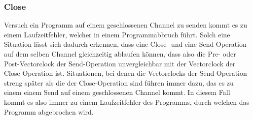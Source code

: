 \subsubsection{Close}
Versuch ein Programm auf einem geschlossenen Channel zu senden kommt es zu einem Laufzeitfehler, 
welcher in einem Programmabbruch führt. Solch eine Situation lässt sich 
dadurch erkennen, dass eine Close- und eine Send-Operation auf dem selben Channel
gleichzeitig ablaufen können, dass also die Pre- oder Post-Vectorclock 
der Send-Operation unvergleichbar mit der Vectorclock der Close-Operation 
ist. Situationen, bei denen die Vectorclocks der Send-Operation streng später 
als die der Close-Operation sind führen immer dazu, das es zu einem einem 
Send auf einem geschlossenen Channel kommt. In diesem Fall kommt es also immer 
zu einem Laufzeitfehler des Programms, durch welchen das Programm abgebrochen wird.

